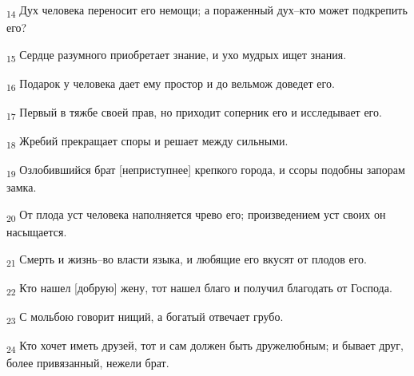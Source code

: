 \begin{tcolorbox}
\textsubscript{14} Дух человека переносит его немощи; а пораженный дух--кто может подкрепить его?
\end{tcolorbox}
\begin{tcolorbox}
\textsubscript{15} Сердце разумного приобретает знание, и ухо мудрых ищет знания.
\end{tcolorbox}
\begin{tcolorbox}
\textsubscript{16} Подарок у человека дает ему простор и до вельмож доведет его.
\end{tcolorbox}
\begin{tcolorbox}
\textsubscript{17} Первый в тяжбе своей прав, но приходит соперник его и исследывает его.
\end{tcolorbox}
\begin{tcolorbox}
\textsubscript{18} Жребий прекращает споры и решает между сильными.
\end{tcolorbox}
\begin{tcolorbox}
\textsubscript{19} Озлобившийся брат [неприступнее] крепкого города, и ссоры подобны запорам замка.
\end{tcolorbox}
\begin{tcolorbox}
\textsubscript{20} От плода уст человека наполняется чрево его; произведением уст своих он насыщается.
\end{tcolorbox}
\begin{tcolorbox}
\textsubscript{21} Смерть и жизнь--во власти языка, и любящие его вкусят от плодов его.
\end{tcolorbox}
\begin{tcolorbox}
\textsubscript{22} Кто нашел [добрую] жену, тот нашел благо и получил благодать от Господа.
\end{tcolorbox}
\begin{tcolorbox}
\textsubscript{23} С мольбою говорит нищий, а богатый отвечает грубо.
\end{tcolorbox}
\begin{tcolorbox}
\textsubscript{24} Кто хочет иметь друзей, тот и сам должен быть дружелюбным; и бывает друг, более привязанный, нежели брат.
\end{tcolorbox}
